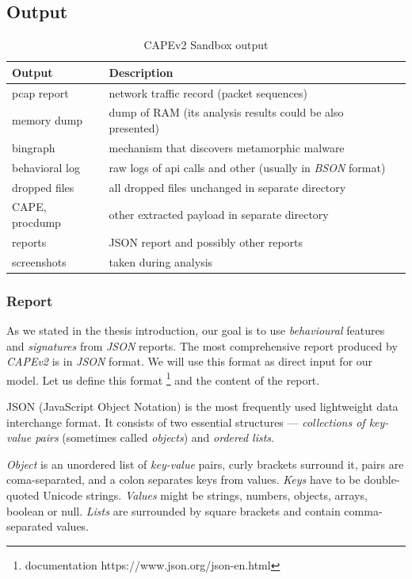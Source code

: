 \subsection*{Output}
\begin{table}[h]
  \centering
  \caption{CAPEv2 Sandbox output}
  \begin{tabular}{p{2cm}p{6cm}p{6cm}} 
      \toprule
      \textbf{Output} &
      \textbf{Description} \\
      \midrule
      pcap report & network traffic record (packet sequences) \\
      \midrule
      memory dump & dump of RAM (its analysis results could be also presented) \\
      \midrule
      bingraph & mechanism that discovers metamorphic malware \cite{Kwon2012}\\
      \midrule
      behavioral log & raw logs of api calls and other (usually in \emph{BSON} format) \\
      \midrule
      dropped files & all dropped files unchanged in separate directory \\
      \midrule
      CAPE, procdump & other extracted payload in separate directory \\
      \midrule
      reports & JSON report and possibly other reports  \\
      \midrule
      screenshots & taken during analysis  \\
      \bottomrule
  \end{tabular}
  \label{tab:sandbox-out}
\end{table}

\subsubsection{Report}
As we stated in the thesis introduction, our goal is to use \emph{behavioural} features and \emph{signatures} from \emph{JSON} reports.  The most comprehensive report produced by \emph{CAPEv2} is in \emph{JSON} format. We will use this format as direct input for our model. Let us define this format \footnote{documentation https://www.json.org/json-en.html} and the content of the report.

JSON (JavaScript Object Notation) is the most frequently used lightweight data interchange format. It consists of two essential structures ---  \emph{collections of key-value pairs} (sometimes called \emph{objects}) and \emph{ordered lists}. 

\emph{Object} is an unordered list of \emph{key-value} pairs, curly brackets surround it, pairs are coma-separated, and a colon separates keys from values. \emph{Keys} have to be double-quoted Unicode strings. \emph{Values} might be strings, numbers, objects, arrays, boolean or null. \emph{Lists} are surrounded by square brackets and contain comma-separated values.

